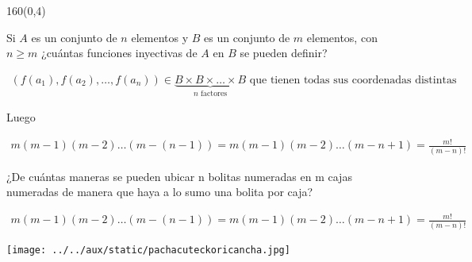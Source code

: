 \documentclass[shownotes,aspectratio=169]{beamer}
\newif\ifes
\newcommand{\es}[1]{\ifes#1\fi}
\begin{document}
 \begin{frame}[plain]
 \begin{textblock}{160}(0,4)
 \centering \LARGE 
 \es{Funciones inyectivas}
 \end{textblock}
 \vspace{1cm}
 \centering
 
 Si $A$ es un conjunto de $n$ elementos y $B$ es un conjunto de $m$ elementos, con $n \geq m$
¿cuántas funciones inyectivas de $A$ en $B$ se pueden definir?
 
\begin{align*}
 (f(a_1),f(a_2),\dots,f(a_n)) \in \underbrace{B \times B \times \dots \times B}_{n \text{ factores}} \text{ que tienen todas sus coordenadas distintas}
\end{align*}

Luego

\begin{align*}
 m(m-1)(m-2)\dots(m-(n-1)) = m(m-1)(m-2)\dots(m-n+1) = \frac{m!}{(m-n)!}
\end{align*}

 
 \end{frame}

 
 \begin{frame}[plain]
  
  ¿De cuántas maneras se pueden ubicar n bolitas numeradas en m cajas
numeradas de manera que haya a lo sumo una bolita por caja?


\begin{align*}
 m(m-1)(m-2)\dots(m-(n-1)) = m(m-1)(m-2)\dots(m-n+1) = \frac{m!}{(m-n)!}
\end{align*}

 \end{frame}


\begin{frame}[plain]
\centering
  \texttt{[image: ../../aux/static/pachacuteckoricancha.jpg]}
\end{frame}
\end{document}
